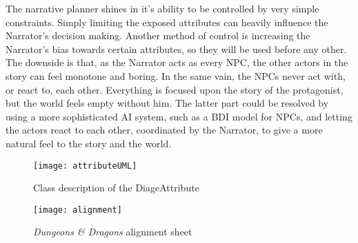 The narrative planner shines in it's ability to be controlled by very simple constraints.
Simply limiting the exposed attributes can heavily influence the Narrator's decision making.
Another method of control is increasing the Narrator's bias towards certain attributes, so they will be used before any other.
The downside is that, as the Narrator acts as every NPC, the other actors in the story can feel monotone and boring.
In the same vain, the NPCs never act with, or react to, each other.
Everything is focused upon the story of the protagonist, but the world feels empty without him.
The latter part could be resolved by using a more sophisticated AI system, such as a BDI model for NPCs, and letting the actors react to each other, coordinated by the Narrator, to give a more natural feel to the story and the world.

\begin{figure}[p]
 \texttt{[image: attributeUML]}
 \caption{Class description of the DiageAttribute}\label{fig:attributeUML}
\end{figure}
\begin{figure}[p]
	\texttt{[image: alignment]}
	\caption{\textit{Dungeons \& Dragons} alignment sheet}\label{fig:dnd}
\end{figure}